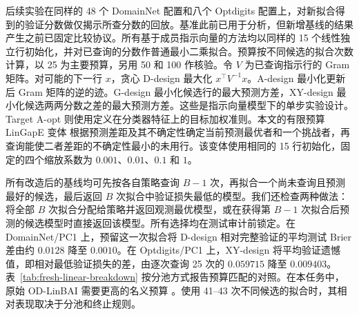 \documentclass[UTF8,fontset=fandol,scheme=chinese,zihao=false,11pt,letterpaper]{ctexart}
\begin{document}
后续实验在同样的 48 个 DomainNet 配置和八个 Optdigits 配置上，对新拟合得到的验证分数做仅揭示所查分数的回放。基准此前已用于分析，但新增基线的结果产生之前已固定比较协议。所有基于成员指示向量的方法均以同样的 15 个线性独立行初始化，并对已查询的分数作普通最小二乘拟合。预算按不同候选的拟合次数计算，以 25 为主要预算，另用 50 和 100 作核验。令 $V$ 为已查询指示行的 Gram 矩阵。对可能的下一行 $x$，贪心 D-design 最大化 $x^\top V^{-1}x$。A-design 最小化更新后 Gram 矩阵的逆的迹。G-design 最小化候选行的最大预测方差，XY-design 最小化候选两两分数之差的最大预测方差。这些是指示向量模型下的单步实验设计。Target A-opt 则使用定义在分类器特征上的目标加权准则。本文的有限预算 LinGapE 变体 \citep{xu2018lingape} 根据预测差距及其不确定性确定当前预测最优者和一个挑战者，再查询能使二者差距的不确定性最小的未用行。该变体使用相同的 15 行初始化，固定的四个缩放系数为 $0.001$、$0.01$、$0.1$ 和 $1$。

所有改造后的基线均可先按各自策略查询 $B-1$ 次，再拟合一个尚未查询且预测最好的候选，最后返回 $B$ 次拟合中验证损失最低的模型。我们还检查两种做法：将全部 $B$ 次拟合分配给策略并返回观测最优模型，或在获得第 $B-1$ 次拟合后预测的候选模型时直接返回该模型。所有选择均在测试审计前锁定。在 DomainNet/PC1 上，预留这一次拟合将 D-design 相对完整验证的平均测试 Brier 差由约 $0.0128$ 降至 $0.0010$。在 Optdigits/PC1 上，XY-design 将平均验证遗憾值，即相对最低验证损失的差，由逐次查询 25 次的 $0.059715$ 降至 $0.009403$。表~\ref{tab:fresh-linear-breakdown} 按分池方式报告预算匹配的对照。在本任务中，原始 OD-LinBAI 需要更高的名义预算 \citep{yangtan2022linbai}。使用 41--43 次不同候选的拟合时，其相对表现取决于分池和终止规则。
\end{document}
